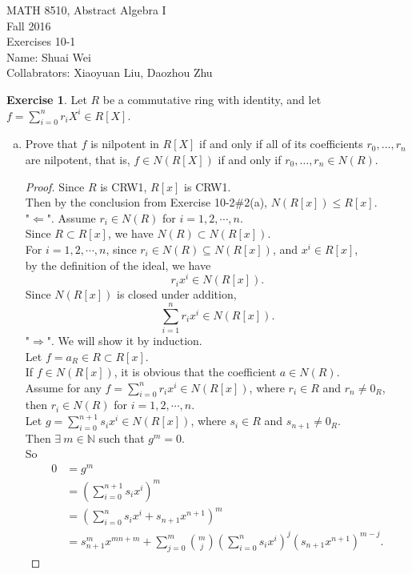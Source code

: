 \documentclass{amsart}
\newcommand{\bbn}{\mathbb{N}}
\theoremstyle{plain}
\theoremstyle{definition}
\newtheorem{exer}[lem]{Exercise}
\begin{document}
\noindent MATH 8510, Abstract Algebra I \\
Fall 2016\\
Exercises 10-1\\
Name: Shuai Wei\\
Collabrators: Xiaoyuan Liu, Daozhou Zhu


%
%
\begin{exer}
Let $R$ be a commutative ring with identity, and let $f=\sum_{i=0}^nr_iX^i\in R[X]$.
\begin{enumerate}[(a)]
\item Prove that $f$ is nilpotent in $R[X]$ if and only if all of its coefficients $r_0,\ldots,r_n$ are nilpotent,
that is, $f\in N(R[X])$ if and only if $r_0,\ldots,r_n\in N(R)$.

\begin{proof}
  Since $R$ is CRW1, $R[x]$ is CRW1.\\
  Then by the conclusion from Exercise 10-2$\#$2(a), $N(R[x]) \leq R[x]$.\\
  "$\Leftarrow$". Assume $r_i \in N(R)$ for $i=1,2,\cdots,n$.\\
  	Since $R \subset R[x]$, we have $N(R) \subset N(R[x])$.\\ 
	For $i=1,2,\cdots,n$, since $r_i \in N(R) \subseteq N(R[x])$, and $x^i \in R[x]$,\\
	by the definition of the ideal, we have
	\[r_ix^i \in N(R[x]).\]
	Since $N(R[x])$ is closed under addition, 
	\[\sum_{i=1}^nr_ix^i \in N(R[x]).\]
	"$\Rightarrow$". We will show it by induction.\\
	Let $f= a_R \in R \subset R[x]$. \\
	If $f\in N(R[x])$, it is obvious that the coefficient $a\in N(R)$.\\
	Assume for any $f=\sum_{i=0}^nr_ix^i \in N(R[x])$, where $r_i \in R$ and $r_n\neq 0_R$, then $r_i \in N(R)$ for $i=1,2,\cdots,n$.\\
	Let $g = \sum_{i=0}^{n+1}s_ix^i \in N(R[x])$, where $s_i \in R$ and $s_{n+1}\neq 0_R$.\\
	Then $\exists \ m \in \bbn$ such that $g^m = 0$.\\
	So
	\begin{align*}
		0 &= g^m\\
	  	  &=\left( \sum_{i=0}^{n+1}s_ix^i \right) ^m\\
	  	  &=\left( \sum_{i=0}^{n}s_ix^i  + s_{n+1}x^{n+1}\right)^m\\
	  	  &= s_{n+1}^mx^{mn+m} +\sum_{j=0}^{m} \binom mj \left(\sum_{i=0}^{n}s_ix^i \right)^{j}  \left(s_{n+1}x^{n+1}\right)^{m-j}.

\end{align*}
\end{proof}
\end{enumerate}
\end{exer}
\end{document}
